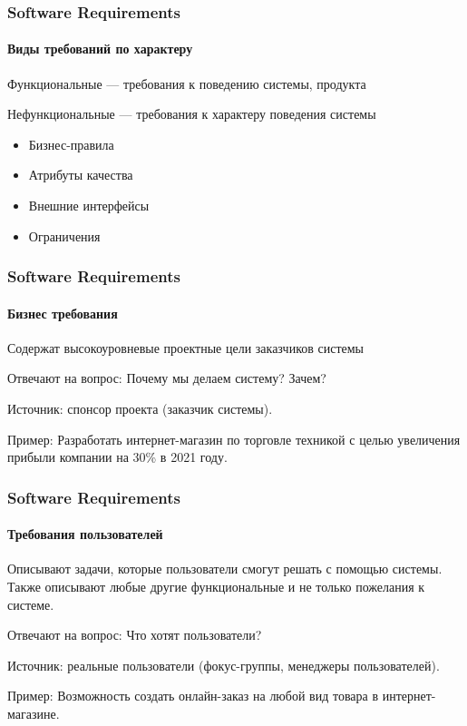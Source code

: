 \documentclass[aspectratio=169, 12pt]{beamer}
\begin{document}
\begin{frame}
    \frametitle{Software Requirements}
    \framesubtitle{Виды требований по характеру} \pause
    Функциональные --- требования к поведению системы, продукта \newline \pause

    Нефункциональные --- требования к характеру поведения системы \pause
    \begin{itemize}
        \item Бизнес-правила
        \item Атрибуты качества
        \item Внешние интерфейсы
        \item Ограничения
    \end{itemize}
\end{frame}

\begin{frame}
    \frametitle{Software Requirements}
    \framesubtitle{Бизнес требования}
    Содержат высокоуровневые проектные цели заказчиков системы \newline \pause

    Отвечают на вопрос: Почему мы делаем систему? Зачем? \newline \pause

    Источник: спонсор проекта (заказчик системы). \newline \pause

    Пример: Разработать интернет-магазин по торговле техникой с целью увеличения
    прибыли компании на 30\% в 2021 году.
\end{frame}

\begin{frame}
    \frametitle{Software Requirements}
    \framesubtitle{Требования пользователей}
    Описывают задачи, которые пользователи смогут решать с помощью системы.
    Также описывают любые другие функциональные и не только пожелания к системе. \newline \pause

    Отвечают на вопрос: Что хотят пользователи? \newline \pause

    Источник: реальные пользователи (фокус-группы, менеджеры пользователей). \newline \pause

    Пример: Возможность создать онлайн-заказ на любой вид товара в интернет-магазине.
\end{frame}
\end{document}
